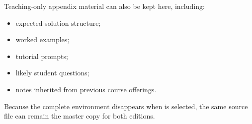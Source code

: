 \documentclass[11pt]{article}
\newif\iftutornotes
\newcommand{\code}[1]{\texttt{\detokenize{#1}}}
\begin{document}
\begin{tutornote}
Teaching-only appendix material can also be kept here, including:

\begin{itemize}
    \item expected solution structure;
    \item worked examples;
    \item tutorial prompts;
    \item likely student questions;
    \item notes inherited from previous course offerings.
\end{itemize}

Because the complete environment disappears when
\code{\string\tutornotesfalse} is selected, the same source file can remain the
master copy for both editions.
\end{tutornote}


\printbibliography
\end{document}
